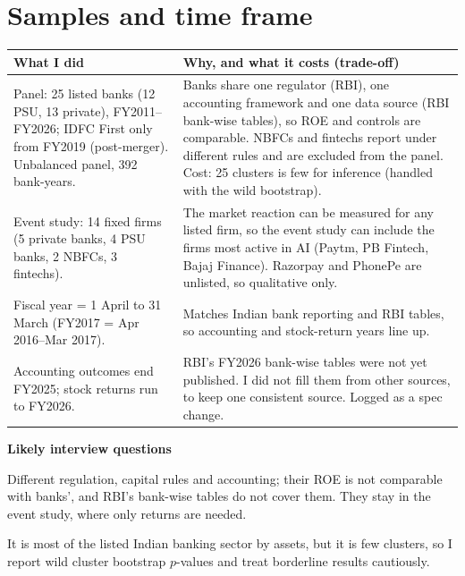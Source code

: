 \documentclass[10.5pt,a4paper]{article}
\newenvironment{decisions}{%
  \begin{longtable}{L{0.36\textwidth} L{0.58\textwidth}}
  \toprule
  \textcolor{head}{\textbf{What I did}} & \textcolor{head}{\textbf{Why, and what it costs (trade-off)}}\\
  \midrule\endhead}{%
  \end{longtable}}
\newcommand{\row}[2]{#1 & #2\\ \midrule}
\newenvironment{qa}{\par\noindent\textcolor{qcol}{\textbf{Likely interview questions}}\begin{description}[font=\normalfont\itshape,leftmargin=0pt,style=nextline]}{\end{description}}
\newcommand{\q}[2]{\item[``#1'']#2}
\begin{document}
\section{Samples and time frame}
\begin{decisions}
\row{Panel: 25 listed banks (12 PSU, 13 private), FY2011--FY2026; IDFC First only from FY2019 (post-merger).
Unbalanced panel, 392 bank-years.}
{Banks share one regulator (RBI), one accounting framework and one data source (RBI bank-wise tables), so ROE and
controls are comparable. NBFCs and fintechs report under different rules and are excluded from the panel. Cost: 25
clusters is few for inference (handled with the wild bootstrap).}
\row{Event study: 14 fixed firms (5 private banks, 4 PSU banks, 2 NBFCs, 3 fintechs).}
{The market reaction can be measured for any listed firm, so the event study can include the firms most active in AI
(Paytm, PB Fintech, Bajaj Finance). Razorpay and PhonePe are unlisted, so qualitative only.}
\row{Fiscal year = 1 April to 31 March (FY2017 = Apr 2016--Mar 2017).}
{Matches Indian bank reporting and RBI tables, so accounting and stock-return years line up.}
\row{Accounting outcomes end FY2025; stock returns run to FY2026.}
{RBI's FY2026 bank-wise tables were not yet published. I did not fill them from other sources, to keep one consistent
source. Logged as a spec change.}
\end{decisions}
\begin{qa}
\q{Why exclude NBFCs and fintechs from the panel?}{Different regulation, capital rules and accounting; their ROE is not
comparable with banks', and RBI's bank-wise tables do not cover them. They stay in the event study, where only
returns are needed.}
\q{Isn't 25 banks too small?}{It is most of the listed Indian banking sector by assets, but it is few clusters, so I
report wild cluster bootstrap $p$-values and treat borderline results cautiously.}
\end{qa}
\end{document}
